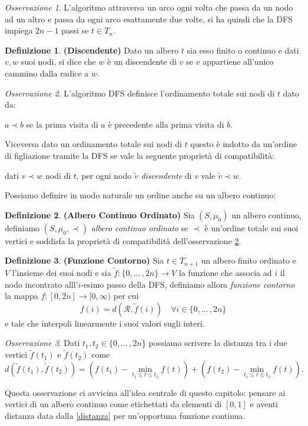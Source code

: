 \documentclass[11pt, twoside]{report}
\theoremstyle{definition}
\newtheorem{definizione}{Definizione}[chapter]
\theoremstyle{plain}
\theoremstyle{remark}
\newtheorem{oss}{Osservazione}[chapter]
\numberwithin{equation}{chapter}
\begin{document}
\begin{oss}
L'algoritmo attraversa un arco ogni volta che passa da un nodo ad un altro e passa da ogni arco esattamente due volte, si ha quindi che la DFS impiega $2n-1$ passi se $t \in T_n$. 
\end{oss}
\begin{definizione}{\textbf{(Discendente)}} Dato un albero $t$ sia esso finito o continuo e dati $v,w$ suoi nodi, si dice che $w$ è un discendente di $v$ se $v$ appartiene all'unico cammino dalla radice a $w$.
\end{definizione}

\begin{oss}\label{oss_compa}
L'algoritmo DFS definisce l'ordinamento totale sui nodi di $t$ dato da:
\begin{center}
$a\prec b$ se la prima visita di $a$ è precedente alla prima visita di $b$.
\end{center}
Viceversa dato un ordinamento totale sui nodi di $t$ questo è indotto da un'ordine di figliazione tramite la DFS se vale la seguente proprietà di compatibilità:
\begin{center}
dati $v\prec w$ nodi di $t$, per ogni nodo $\tilde{v}$ \textit{discendente} di $v$ vale $\tilde{v}\prec w$.
\end{center}
\end{oss}
Possiamo definire in modo naturale un ordine anche su un albero continuo:
\begin{definizione}{\textbf{(Albero Continuo Ordinato)}}
Sia $(S, \mu_0)$ un albero continuo, definiamo $(S, \mu_0, \prec)$ \textit{albero continuo ordinato} se $\prec$ è un'ordine totale sui suoi vertici e soddisfa la proprietà di compatibilità dell'osservazione \ref{oss_compa}.
\end{definizione}

\begin{definizione}{\textbf{(Funzione Contorno)}}
Sia $t\in T_{n+1}$ un albero finito ordinato e $V$ l'insieme dei suoi nodi e sia $\tilde{f}:\{0, ...\, ,2n\}\longrightarrow V$ la funzione che associa ad $i$ il nodo incontrato alll'$i$-esimo passo della DFS, definiamo allora \textit{funzione contorno} la mappa ${f:[0, 2n]\longrightarrow[0,\infty)}$ per cui 
$$f(i)=d(\mathcal{R}, \tilde{f}(i)) \quad \forall i \in \{0, ...\, ,2n\}$$
e tale che interpoli linearmente i suoi valori sugli interi.
\end{definizione}

\begin{oss}
Dati $t_1, t_2 \in \{0, ...\, ,2n$\} possiamo scrivere la distanza tra i due vertici $\tilde{f}(t_1)$ e $\tilde{f}(t_2)$ come
\begin{equation} \label{distanza}
d(\tilde{f}(t_1), \tilde{f}(t_2))=\left( f(t_1) - \min\limits_{t_1\leq t \leq t_2} f(t) \right) + \left( f(t_2) - \min\limits_{t_1\leq t \leq t_2} f(t) \right).
\end{equation}
\end{oss}
Questa osservazione ci avvicina all'idea centrale di questo capitolo: pensare ai vertici di un albero continuo come etichettati da elementi di $[0,1]$ e aventi distanza data dalla \eqref{distanza} per un'opportuna funzione continua.
\end{document}
